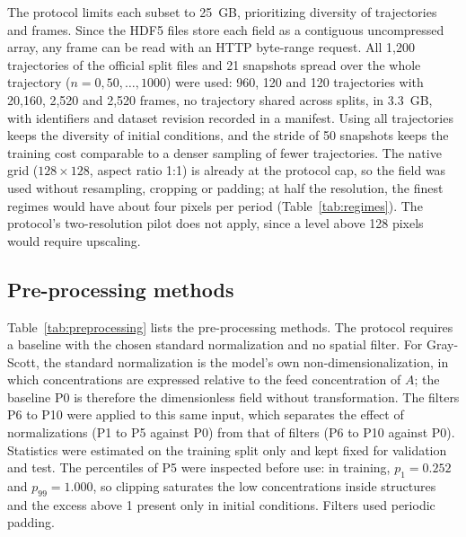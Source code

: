 \documentclass[final,5p,times,twocolumn]{elsarticle}
\begin{document}
The protocol limits each subset to 25~GB, prioritizing diversity of trajectories and frames. Since the HDF5 files store each field as a contiguous uncompressed array, any frame can be read with an HTTP byte-range request. All 1,200 trajectories of the official split files and 21 snapshots spread over the whole trajectory ($n=0,50,\dots,1000$) were used: 960, 120 and 120 trajectories with 20,160, 2,520 and 2,520 frames, no trajectory shared across splits, in 3.3~GB, with identifiers and dataset revision recorded in a manifest. Using all trajectories keeps the diversity of initial conditions, and the stride of 50 snapshots keeps the training cost comparable to a denser sampling of fewer trajectories. The native grid ($128\times128$, aspect ratio 1:1) is already at the protocol cap, so the field was used without resampling, cropping or padding; at half the resolution, the finest regimes would have about four pixels per period (Table~\ref{tab:regimes}). The protocol's two-resolution pilot does not apply, since a level above 128 pixels would require upscaling.

\subsection{Pre-processing methods}\label{subsec:preprocessing}

Table~\ref{tab:preprocessing} lists the pre-processing methods. The protocol requires a baseline with the chosen standard normalization and no spatial filter. For Gray-Scott, the standard normalization is the model's own non-dimensionalization, in which concentrations are expressed relative to the feed concentration of $A$; the baseline P0 is therefore the dimensionless field without transformation. The filters P6 to P10 were applied to this same input, which separates the effect of normalizations (P1 to P5 against P0) from that of filters (P6 to P10 against P0). Statistics were estimated on the training split only and kept fixed for validation and test. The percentiles of P5 were inspected before use: in training, $p_1=0.252$ and $p_{99}=1.000$, so clipping saturates the low concentrations inside structures and the excess above 1 present only in initial conditions. Filters used periodic padding.
\end{document}
